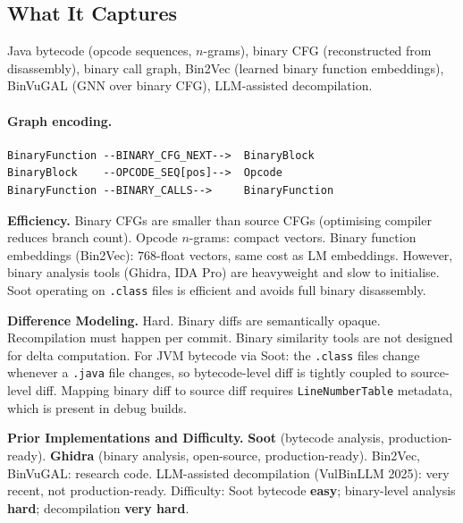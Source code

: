 \documentclass[12pt,a4paper]{article}
\begin{document}
\subsection{What It Captures}

Java bytecode (opcode sequences, $n$-grams), binary CFG (reconstructed from
disassembly), binary call graph, Bin2Vec (learned binary function embeddings),
BinVuGAL (GNN over binary CFG), LLM-assisted decompilation.

\paragraph{Graph encoding.}
\begin{lstlisting}
BinaryFunction --BINARY_CFG_NEXT-->  BinaryBlock
BinaryBlock    --OPCODE_SEQ[pos]-->  Opcode
BinaryFunction --BINARY_CALLS-->     BinaryFunction
\end{lstlisting}

\begin{effbox}
\textbf{Efficiency.}
Binary CFGs are smaller than source CFGs (optimising compiler reduces branch
count). Opcode $n$-grams: compact vectors. Binary function embeddings
(Bin2Vec): $768$-float vectors, same cost as LM embeddings. However, binary
analysis tools (Ghidra, IDA Pro) are heavyweight and slow to initialise.
Soot operating on \texttt{.class} files is efficient and avoids full binary
disassembly.
\end{effbox}

\begin{diffbox}
\textbf{Difference Modeling.}
Hard. Binary diffs are semantically opaque. Recompilation must happen per
commit. Binary similarity tools are not designed for delta computation. For
JVM bytecode via Soot: the \texttt{.class} files change whenever a
\texttt{.java} file changes, so bytecode-level diff is tightly coupled to
source-level diff. Mapping binary diff to source diff requires
\texttt{LineNumberTable} metadata, which is present in debug builds.
\end{diffbox}

\begin{implbox}
\textbf{Prior Implementations and Difficulty.}
\textbf{Soot} (bytecode analysis, production-ready). \textbf{Ghidra}
(binary analysis, open-source, production-ready). Bin2Vec, BinVuGAL: research
code. LLM-assisted decompilation (VulBinLLM 2025): very recent, not
production-ready. Difficulty: Soot bytecode \textbf{easy};
binary-level analysis \textbf{hard}; decompilation \textbf{very hard}.
\end{implbox}
\end{document}
